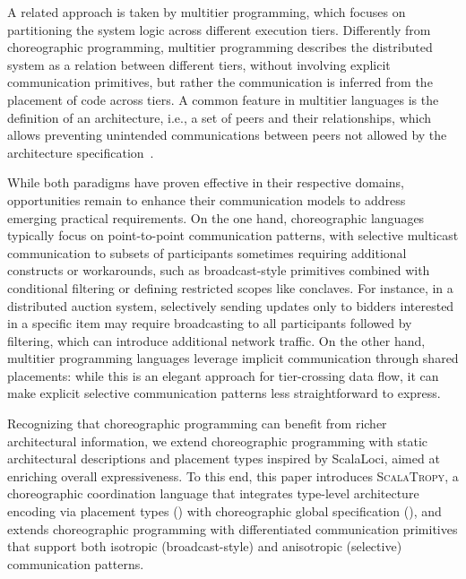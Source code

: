 \documentclass[runningheads]{llncs}
\newcommand{\ourLang}{\textsc{ScalaTropy}}
\newcommand{\diff}[1]{{#1}}
\begin{document}
A related approach is taken by multitier programming,
which focuses on partitioning the system logic across different execution tiers.
%
Differently from choreographic programming,
multitier programming describes the distributed system as a relation between different tiers,
without involving explicit communication primitives,
but rather the communication is inferred from the placement of code across tiers.
%
A common feature in multitier languages is the definition of an architecture,
i.e.,
a set of peers and their relationships,
which allows preventing unintended communications between peers not allowed by the architecture specification~\cite{Weisenburger2020Implementing}.

While both paradigms have proven effective in their respective domains,
opportunities remain to enhance their communication models to address emerging practical requirements.
%
On the one hand, choreographic languages typically focus on point-to-point communication patterns,
with selective multicast communication to subsets of participants
  sometimes requiring additional constructs or workarounds,
  such as broadcast-style primitives combined with conditional filtering or defining restricted scopes like conclaves.
%
For instance, in a distributed auction system, 
 selectively sending updates only to bidders interested in a specific item 
 may require broadcasting to all participants followed by filtering, 
 which can introduce additional network traffic.
%
On the other hand, multitier programming languages leverage implicit communication through shared placements:
 while this is an elegant approach for tier-crossing data flow, it can make explicit selective communication patterns less straightforward to express.
%

Recognizing that \diff{choreographic programming can benefit from richer architectural information,
we extend choreographic programming with static architectural descriptions and placement types inspired by ScalaLoci}, aimed at enriching overall expressiveness.
%
To this end, this paper introduces \ourLang{},
\diff{a choreographic} coordination language that integrates type-level architecture encoding via placement types () with choreographic global specification (),
\diff{and extends choreographic programming} with differentiated communication primitives that support both isotropic (broadcast-style) and anisotropic (selective) communication patterns. %
\end{document}
